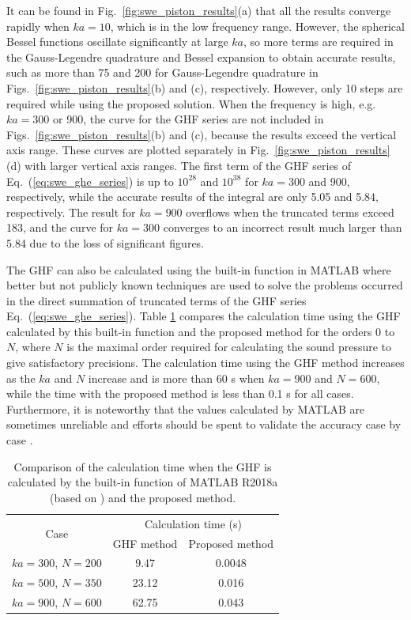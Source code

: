 It can be found in Fig.~\ref{fig:swe_piston_results}(a) that all the results converge rapidly when $ka = 10$, which is in the low frequency range. 
However, the spherical Bessel functions oscillate significantly at large $ka$, so more terms are required in the Gauss-Legendre quadrature and Bessel expansion to obtain accurate results, such as more than 75 and 200 for Gauss-Legendre quadrature in Figs.~\ref{fig:swe_piston_results}(b) and (c), respectively. 
However, only 10 steps are required while using the proposed solution. When the frequency is high, e.g.\ $ka = 300$ or 900, the curve for the GHF series are not included in Figs.~\ref{fig:swe_piston_results}(b) and (c), because the results exceed the vertical axis range. These curves are plotted separately in Fig.~\ref{fig:swe_piston_results}(d) with larger vertical axis ranges. 
The first term of the GHF series of Eq.~(\ref{eq:swe_ghe_series}) is up to $10^{28}$ and $10^{38}$ for $ka = 300$ and 900, respectively, while the accurate results of the integral are only 5.05 and 5.84, respectively.
The result for $ka = 900$ overflows when the truncated terms exceed 183, and the curve for $ka = 300$ converges to an incorrect result much larger than 5.84 due to the loss of significant figures.

The GHF can also be calculated using the built-in function  in MATLAB where better but not publicly known techniques are used to solve the problems occurred in the direct summation of truncated terms of the GHF series Eq.~(\ref{eq:swe_ghe_series}). 
Table \ref{tab:swe_calc_time} compares the calculation time using the GHF calculated by this built-in function and the proposed method for the orders 0 to $N$, where $N$ is the maximal order required for calculating the sound pressure to give satisfactory precisions. 
The calculation time using the GHF method increases as the $ka$ and $N$ increase and is more than 60 s when $ka = 900$ and $N = 600$, while the time with the proposed method is less than 0.1 s for all cases. 
Furthermore, it is noteworthy that the values calculated by MATLAB are sometimes unreliable and efforts should be spent to validate the accuracy case by case \cite{Pearson2009ComputationHypergeometricFunctions}.

\begin{table}
    \centering
    \begin{tabular}{ccc}
        \toprule
        \multirow{2}{*}{Case}
        & \multicolumn{2}{c}{Calculation time (s)} \\
        \cmidrule(lr){2-3}
        & GHF method & Proposed method\\
        \midrule
        $ka=300$, $N=200$ & 9.47 & 0.0048 \\
        $ka=500$, $N=350$ & 23.12 & 0.016 \\
        $ka = 900$, $N=600$ & 62.75 & 0.043\\
        \bottomrule
    \end{tabular}
    \caption{Comparison of the calculation time when the GHF is calculated by the built-in function  of MATLAB R2018a (based on ) and the proposed method.}
    \label{tab:swe_calc_time}
\end{table}


